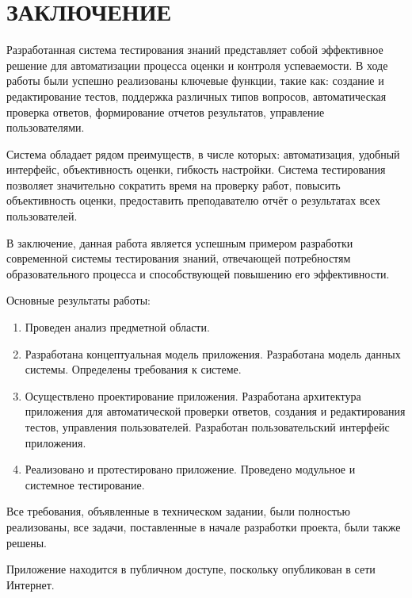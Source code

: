 \section*{ЗАКЛЮЧЕНИЕ}

Разработанная система тестирования знаний представляет собой эффективное решение для автоматизации процесса оценки и контроля успеваемости. В ходе работы были успешно реализованы ключевые функции, такие как: создание и редактирование тестов, поддержка различных типов вопросов, автоматическая проверка ответов, формирование отчетов результатов, управление пользователями.

Система обладает рядом преимуществ, в числе которых: автоматизация, удобный интерфейс, объективность оценки, гибкость настройки. Система тестирования позволяет значительно сократить время на проверку работ, повысить объективность оценки, предоставить преподавателю отчёт о результатах всех пользователей.

В заключение, данная работа является успешным примером разработки современной системы тестирования знаний, отвечающей потребностям образовательного процесса и способствующей повышению его эффективности.

Основные результаты работы:

\begin{enumerate}
\item Проведен анализ предметной области.
\item Разработана концептуальная модель приложения. Разработана модель данных системы. Определены требования к системе.
\item Осуществлено проектирование приложения. Разработана архитектура приложения для автоматической проверки ответов, создания и редактирования тестов, управления пользователей. Разработан пользовательский интерфейс приложения.
\item Реализовано и протестировано приложение. Проведено модульное и системное тестирование.
\end{enumerate}

Все требования, объявленные в техническом задании, были полностью реализованы, все задачи, поставленные в начале разработки проекта, были также решены.

Приложение находится в публичном доступе, поскольку опубликован в сети Интернет.  
